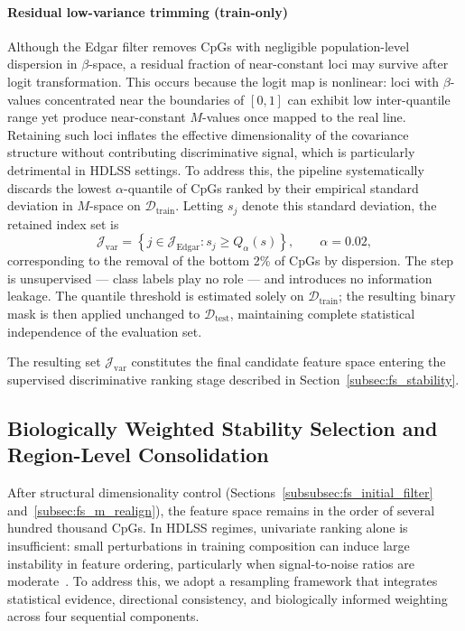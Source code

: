\paragraph{Residual low-variance trimming (train-only)}

Although the Edgar filter removes CpGs with negligible population-level
dispersion in $\beta$-space, a residual fraction of near-constant loci may
survive after logit transformation. This occurs because the logit map is
nonlinear: loci with $\beta$-values concentrated near the boundaries of $[0,1]$
can exhibit low inter-quantile range yet produce near-constant $M$-values once
mapped to the real line. Retaining such loci inflates the effective dimensionality
of the covariance structure without contributing discriminative signal, which
is particularly detrimental in HDLSS settings.
To address this, the pipeline systematically discards the lowest
$\alpha$-quantile of CpGs ranked by their empirical standard deviation in
$M$-space on $\mathcal{D}_{\mathrm{train}}$. Letting $s_j$ denote this
standard deviation, the retained index set is
\begin{equation}
    \mathcal{J}_{\mathrm{var}}
    =
    \left\{
        j \in \mathcal{J}_{\mathrm{Edgar}} :
        s_j \geq Q_{\alpha}(s)
    \right\},
    \qquad
    \alpha = 0.02,
\end{equation}
corresponding to the removal of the bottom 2\% of CpGs by dispersion.
The step is unsupervised — class labels play no role — and introduces no
information leakage. The quantile threshold is estimated solely on
$\mathcal{D}_{\mathrm{train}}$; the resulting binary mask is then applied
unchanged to $\mathcal{D}_{\mathrm{test}}$, maintaining complete statistical
independence of the evaluation set.

The resulting set $\mathcal{J}_{\mathrm{var}}$ constitutes the final candidate
feature space entering the supervised discriminative ranking stage described
in Section~\ref{subsec:fs_stability}.

\subsection{Biologically Weighted Stability Selection and Region-Level Consolidation}
\label{subsec:fs_stability_ranking}

After structural dimensionality control 
(Sections~\ref{subsubsec:fs_initial_filter} 
and~\ref{subsec:fs_m_realign}), the feature space remains 
in the order of several hundred thousand CpGs. In HDLSS 
regimes, univariate ranking alone is insufficient: small 
perturbations in training composition can induce large 
instability in feature ordering, particularly when 
signal-to-noise ratios are 
moderate~\cite{Hall2005, Donoho2000}. To address this, we 
adopt a resampling framework that integrates statistical 
evidence, directional consistency, and biologically informed 
weighting across four sequential components.

